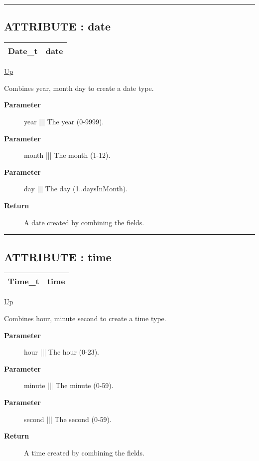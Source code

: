 \par


\rule{\textwidth}{0.4pt}
\subsection*{ATTRIBUTE : date}
\hypertarget{ecldoc:date.secondstoparts.result.date}{}

{\renewcommand{\arraystretch}{1.5}
\begin{tabularx}{\textwidth}{|>{\raggedright\arraybackslash}l|X|}
\hline
\hspace{0pt}Date\_t & date \\
\hline
\end{tabularx}
}

\hyperlink{ecldoc:date.secondstoparts}{Up}

\par
Combines year, month day to create a date type.

\par
\begin{description}
\item [\textbf{Parameter}] year ||| The year (0-9999).
\item [\textbf{Parameter}] month ||| The month (1-12).
\item [\textbf{Parameter}] day ||| The day (1..daysInMonth).
\item [\textbf{Return}] A date created by combining the fields.
\end{description}

\rule{\textwidth}{0.4pt}
\subsection*{ATTRIBUTE : time}
\hypertarget{ecldoc:date.secondstoparts.result.time}{}

{\renewcommand{\arraystretch}{1.5}
\begin{tabularx}{\textwidth}{|>{\raggedright\arraybackslash}l|X|}
\hline
\hspace{0pt}Time\_t & time \\
\hline
\end{tabularx}
}

\hyperlink{ecldoc:date.secondstoparts}{Up}

\par
Combines hour, minute second to create a time type.

\par
\begin{description}
\item [\textbf{Parameter}] hour ||| The hour (0-23).
\item [\textbf{Parameter}] minute ||| The minute (0-59).
\item [\textbf{Parameter}] second ||| The second (0-59).
\item [\textbf{Return}] A time created by combining the fields.
\end{description}

